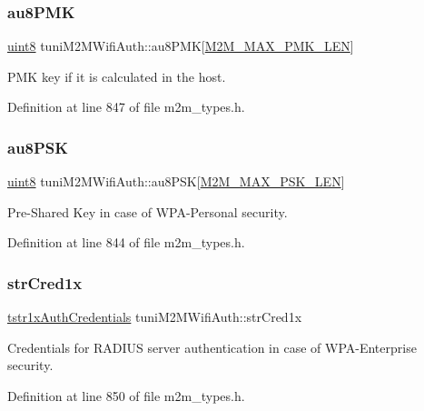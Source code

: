 \subsubsection{\texorpdfstring{au8\+P\+MK}{au8PMK}}
{\footnotesize\ttfamily \hyperlink{group__DataT_ga4df709a77647e870bbf1d955b8edc9a6}{uint8} tuni\+M2\+M\+Wifi\+Auth\+::au8\+P\+MK\mbox{[}\hyperlink{group__WlanDefines_ga160183536c79910c9743ac0acf863e5d}{M2\+M\+\_\+\+M\+A\+X\+\_\+\+P\+M\+K\+\_\+\+L\+EN}\mbox{]}}

P\+MK key if it is calculated in the host. 

Definition at line 847 of file m2m\+\_\+types.\+h.

\mbox{\label{uniontuniM2MWifiAuth_a690bf7d430705e5564cf5df90197a59c}} 
\subsubsection{\texorpdfstring{au8\+P\+SK}{au8PSK}}
{\footnotesize\ttfamily \hyperlink{group__DataT_ga4df709a77647e870bbf1d955b8edc9a6}{uint8} tuni\+M2\+M\+Wifi\+Auth\+::au8\+P\+SK\mbox{[}\hyperlink{group__WlanDefines_ga790a7e0471ff8a179238863dc2021f6d}{M2\+M\+\_\+\+M\+A\+X\+\_\+\+P\+S\+K\+\_\+\+L\+EN}\mbox{]}}

Pre-\/\+Shared Key in case of W\+P\+A-\/\+Personal security. 

Definition at line 844 of file m2m\+\_\+types.\+h.

\mbox{\label{uniontuniM2MWifiAuth_a6200150169d009f5da0d51be9e7dee15}} 
\subsubsection{\texorpdfstring{str\+Cred1x}{strCred1x}}
{\footnotesize\ttfamily \hyperlink{structtstr1xAuthCredentials}{tstr1x\+Auth\+Credentials} tuni\+M2\+M\+Wifi\+Auth\+::str\+Cred1x}

Credentials for R\+A\+D\+I\+US server authentication in case of W\+P\+A-\/\+Enterprise security. 

Definition at line 850 of file m2m\+\_\+types.\+h.

